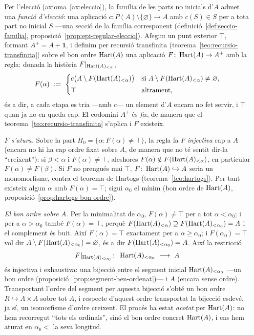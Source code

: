 \begin{prova}
Per l'elecció (axioma~\ref{ax:eleccio}), la família de les parts no inicials
d'\(A\) admet una \emph{funció d'elecció}: una aplicació
\(c\colon P(A)\setminus\{\varnothing\}\to A\) amb \(c(S)\in S\) per a tota
part no inicial \(S\) ---una secció de la família corresponent
(definició~\ref{def:seccio-familia}, proposició~\ref{prop:epi-regular-eleccio}).
Afegim un punt exterior \(\top\), formant \(A^{+}=A+\mathbf1\), i definim per
recursió transfinita (teorema~\ref{teo:recursio-transfinita}) sobre el bon
ordre \(\operatorname{Hart}(A)\) una aplicació \(F\colon\operatorname{Hart}(A)\to A^{+}\) amb la regla:
donada la història \(F|_{\operatorname{Hart}(A)_{<\alpha}}\),
\[
F(\alpha)\ :=\
\begin{cases}
c\bigl(A\setminus F(\operatorname{Hart}(A)_{<\alpha})\bigr) & \text{si } A\setminus F(\operatorname{Hart}(A)_{<\alpha})\neq\varnothing,\\[1mm]
\top & \text{altrament,}
\end{cases}
\]
és a dir, a cada etapa es tria ---amb \(c\)--- un element d'\(A\) encara no
fet servir, i \(\top\) quan ja no en queda cap. El codomini \(A^{+}\) és
\emph{fix}, de manera que el teorema~\ref{teo:recursio-transfinita} s'aplica i
\(F\) existeix.

\emph{\(F\) s'atura.} Sobre la part \(H_0=\{\alpha:F(\alpha)\neq\top\}\), la
regla fa \(F\) \emph{injectiva} cap a \(A\) (encara no hi ha cap ordre fixat
sobre \(A\), de manera que no té sentit dir-la \enquote{creixent}): si
\(\beta<\alpha\) i \(F(\alpha)\neq\top\), aleshores
\(F(\alpha)\notin F(\operatorname{Hart}(A)_{<\alpha})\), en particular \(F(\alpha)\neq
F(\beta)\). Si \(F\) no prengués mai \(\top\),
\(F\colon\operatorname{Hart}(A)\hookrightarrow A\) seria un monomorfisme, contra el teorema
de Hartogs (teorema~\ref{teo:hartogs}). Per tant existeix algun \(\alpha\) amb
\(F(\alpha)=\top\); sigui \(\alpha_0\) el mínim
(bon ordre de \(\operatorname{Hart}(A)\), proposició~\ref{prop:hartogs-bon-ordre}).

\emph{El bon ordre sobre \(A\).} Per la minimalitat de \(\alpha_0\),
\(F(\alpha)\neq\top\) per a tot \(\alpha<\alpha_0\); i per a
\(\alpha>\alpha_0\) també \(F(\alpha)=\top\), perquè
\(F(\operatorname{Hart}(A)_{<\alpha})\supseteq F(\operatorname{Hart}(A)_{<\alpha_0})=A\) i el complement
és buit. Així \(F(\alpha)=\top\) exactament per a \(\alpha\ge\alpha_0\); i
\(F(\alpha_0)=\top\) vol dir \(A\setminus F(\operatorname{Hart}(A)_{<\alpha_0})=\varnothing\),
és a dir \(F(\operatorname{Hart}(A)_{<\alpha_0})=A\). Així la restricció
\[
F|_{\Hart(A)_{<\alpha_0}}\colon\ \Hart(A)_{<\alpha_0}\ \longrightarrow\ A
\]
és injectiva i exhaustiva: una bijecció entre el segment inicial
\(\operatorname{Hart}(A)_{<\alpha_0}\) ---un bon ordre (proposició~\ref{prop:segment-ben-ordenat})---
i \(A\) (encara sense ordre). Transportant l'ordre del segment per aquesta
bijecció s'obté un bon ordre \(R\hookrightarrow A\times A\) sobre tot \(A\), i
respecte d'aquest ordre transportat la bijecció esdevé, ja sí, un isomorfisme
d'ordre creixent. El procés ha estat
\emph{acotat} per \(\operatorname{Hart}(A)\): no hem recorregut \enquote{tots els
ordinals}, sinó el bon ordre concret \(\operatorname{Hart}(A)\), i ens hem aturat en
\(\alpha_0<\) la seva longitud.
\end{prova}

